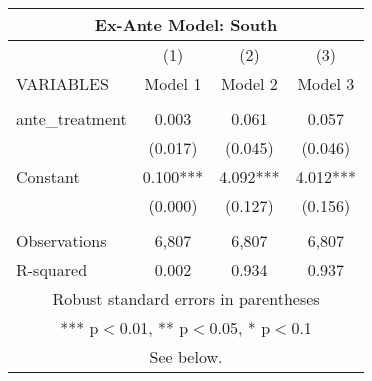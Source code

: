 \begin{tabular}{lccc}
\multicolumn{4}{c}{Ex-Ante Model: South} \\ \hline
 & (1) & (2) & (3) \\
VARIABLES & Model 1 & Model 2 & Model 3 \\ \hline
 &  &  &  \\
ante\_treatment & 0.003 & 0.061 & 0.057 \\
 & (0.017) & (0.045) & (0.046) \\
Constant & 0.100*** & 4.092*** & 4.012*** \\
 & (0.000) & (0.127) & (0.156) \\
 &  &  &  \\
Observations & 6,807 & 6,807 & 6,807 \\
 R-squared & 0.002 & 0.934 & 0.937 \\ \hline
\multicolumn{4}{c}{ Robust standard errors in parentheses} \\
\multicolumn{4}{c}{ *** p$<$0.01, ** p$<$0.05, * p$<$0.1} \\
\multicolumn{4}{c}{ See below.} \\
\end{tabular}
